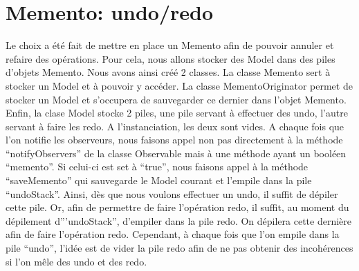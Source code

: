 \chapter{Memento: undo/redo}

Le choix a été fait de mettre en place un Memento afin de pouvoir annuler et
refaire des opérations. Pour cela, nous allons stocker des Model
dans des piles d'objets Memento. Nous avons ainsi créé 2 classes. La classe
Memento sert à stocker un Model et à pouvoir y accéder. La classe
MementoOriginator permet de stocker un Model et s'occupera de sauvegarder
ce dernier dans l'objet Memento. Enfin, la clase Model stocke 2 piles, une pile
servant à effectuer des undo, l'autre servant à faire les redo. A l'instanciation, les deux sont vides. A chaque fois que l'on notifie les
observeurs, nous faisons appel non pas directement à la méthode ``notifyObservers'' de la classe Observable mais à une méthode ayant un booléen
``memento''. Si celui-ci est set à ``true'', nous faisons appel à
la méthode ``saveMemento'' qui sauvegarde le Model courant et l'empile dans la pile ``undoStack''. Ainsi, dès que nous voulons effectuer un undo,
il suffit de dépiler cette pile. Or, afin de permettre de faire l'opération redo, il suffit, au moment du dépilement d'''undoStack'', d'empiler dans
la pile redo. On dépilera cette dernière afin de faire l'opération redo. Cependant, à chaque fois que l'on empile dans la pile
``undo'',  l'idée est de vider la pile redo afin de ne pas obtenir des incohérences si l'on mêle des undo et des redo.
